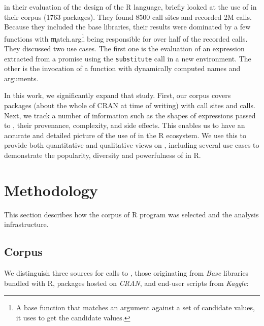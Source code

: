 \documentclass[screen,acmsmall]{acmart}%
\renewcommand{\k}[1]{\lstinline |#1|\xspace}
\begin{document}
\citet{ecoop12} in their evaluation of the design of the R language, briefly
looked at the use of \eval in their corpus (1763 packages). They found 8500
\eval call sites and recorded 2M \eval calls. Because they included the base
libraries, their results were dominated by a few functions with
\c{match.arg}\footnote{A base function that matches an argument against a set of
candidate values, it uses \eval to get the candidate values.} being responsible
for over half of the recorded \eval calls. They discussed two use cases. The
first one is the evaluation of an expression extracted from a promise using the
\k{substitute} call in a new environment. The other is the invocation of a
function with dynamically computed names and arguments.

In this work, we significantly expand that study. First, our corpus covers
\CranPackages packages (about the whole of CRAN at time of writing) with
\PkgHitEvalCallSites \eval call sites and \packageAllcallsRnd \eval calls.
Next, we track a number of information such as the shapes of expressions
passed to \eval, their provenance, complexity, and side effects. This enables
us to have an accurate and detailed picture of the use of \eval in the R
ecosystem. We use this to provide both quantitative and qualitative views on
\eval, including several use cases to demonstrate the popularity, diversity and
powerfulness of \eval in R.

\section{Methodology}

This section describes how the corpus of R program was selected and the analysis
infrastructure.

\subsection{Corpus}

We distinguish three sources for calls to \eval, those originating from
\emph{Base} libraries bundled with R, packages hosted on \emph{CRAN}, and
end-user scripts from \emph{Kaggle}:
\end{document}
